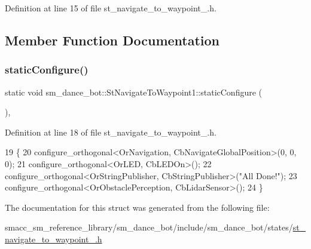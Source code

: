 Definition at line 15 of file st\+\_\+navigate\+\_\+to\+\_\+waypoint\+\_.\+h.



\subsection{Member Function Documentation}
\mbox{\label{structsm__dance__bot_1_1StNavigateToWaypoint1_ae64899be8775f9ac0aaaead84c5cba5f}} 
\subsubsection{\texorpdfstring{static\+Configure()}{staticConfigure()}}
{\footnotesize\ttfamily static void sm\+\_\+dance\+\_\+bot\+::\+St\+Navigate\+To\+Waypoint1\+::static\+Configure (\begin{DoxyParamCaption}{ }\end{DoxyParamCaption})\hspace{0.3cm}{\ttfamily [inline]}, {\ttfamily [static]}}



Definition at line 18 of file st\+\_\+navigate\+\_\+to\+\_\+waypoint\+\_.\+h.


\begin{DoxyCode}
19   \{
20     configure\_orthogonal<OrNavigation, CbNavigateGlobalPosition>(0, 0, 0);
21     configure\_orthogonal<OrLED, CbLEDOn>();
22     configure\_orthogonal<OrStringPublisher, CbStringPublisher>(\textcolor{stringliteral}{"All Done!"});
23     configure\_orthogonal<OrObstaclePerception, CbLidarSensor>();
24   \}
\end{DoxyCode}


The documentation for this struct was generated from the following file\+:\begin{DoxyCompactItemize}
\item 
smacc\+\_\+sm\+\_\+reference\+\_\+library/sm\+\_\+dance\+\_\+bot/include/sm\+\_\+dance\+\_\+bot/states/\hyperlink{include_2sm__dance__bot_2states_2st__navigate__to__waypoint__1_8h}{st\+\_\+navigate\+\_\+to\+\_\+waypoint\+\_.\+h}\end{DoxyCompactItemize}

